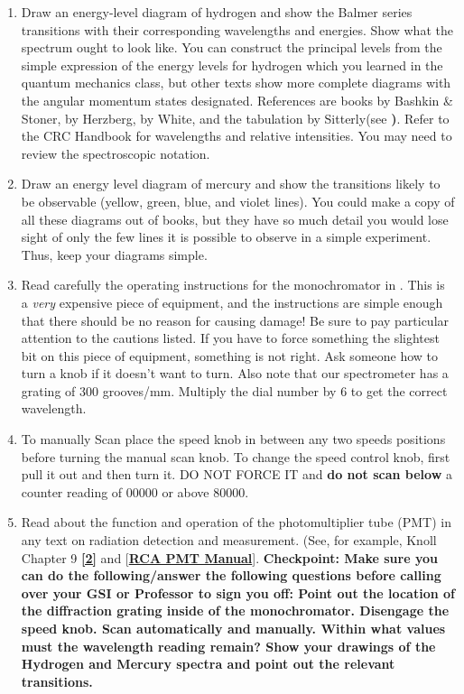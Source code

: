 \documentclass{../lab}
\begin{document}
\begin{enumerate}
    \item Draw an energy-level diagram of hydrogen and show the Balmer series transitions with their corresponding wavelengths and energies. Show what the spectrum ought to look like. You can construct the principal levels from the simple expression of the energy levels for hydrogen which you learned in the quantum mechanics class, but other texts show more complete diagrams with the angular momentum states designated. References are books by Bashkin \& Stoner, by Herzberg, by White, and the tabulation by Sitterly(see \textbf{)}. Refer to the CRC Handbook for wavelengths and relative intensities. You may need to review the spectroscopic notation.

    \item Draw an energy level diagram of mercury and show the transitions likely to be observable (yellow, green, blue, and violet lines).
	You could make a copy of all these diagrams out of books, but they have so much detail you would lose sight of only the few lines it is possible to observe in a simple experiment. Thus, keep your diagrams simple.

    \item Read carefully the operating instructions for the monochromator in . This is a \emph{very} expensive piece of equipment, and the instructions are simple enough that there should be no reason for causing damage! Be sure to pay particular attention to the cautions listed. If you have to force something the slightest bit on this piece of equipment, something is not right. Ask someone how to turn a knob if it doesn't want to turn. Also note that our spectrometer has a grating of 300 grooves/mm. Multiply the dial number by 6 to get the correct wavelength.

    \item To manually Scan place the speed knob in between any two speeds positions before turning the manual scan knob. To change the speed control knob, first pull it out and then turn it. DO NOT FORCE IT and \textbf{do not scan below} a counter reading of 00000 or above 80000.

    \item Read about the function and operation of the photomultiplier tube (PMT) in any text on radiation detection and measurement. (See, for example, Knoll Chapter 9 \href{http://physics111.lib.berkeley.edu/Physics111/Reprints/Knoll-Radiation\%20Detection\%20&\%20Measurement/01-Radiation\_Detection\_and\_Measurement\_CH\_09.pdf}{\textbf{[2]}} and [\href{http://physics111.lib.berkeley.edu/Physics111/Reprints/GMA/RCA\%20PMT.pdf}{\textbf{RCA PMT Manual}}].
 \textbf{Checkpoint: Make sure you can do the following/answer the following questions before calling over your GSI or Professor to sign you off:
	Point out the location of the diffraction grating inside of the monochromator. Disengage the speed knob. Scan automatically and manually. Within what values must the wavelength reading remain? Show your drawings of the Hydrogen and Mercury spectra and point out the relevant transitions.}

\end{enumerate}
\end{document}
